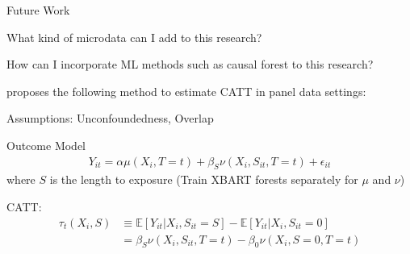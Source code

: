 \documentclass[aspectratio=169,xcolor=dvipsnames]{beamer}
\newenvironment{wideitemize}{\itemize\addtolength{\itemsep}{10pt}}{\enditemize}
\begin{document}
\begin{frame}{Future Work}

\begin{wideitemize}
    \item What kind of microdata can I add to this research?
    \item How can I incorporate ML methods such as causal forest to this research?
    \begin{wideitemize}
        \item \textcite{wang2024longbet} proposes the following method to estimate CATT in panel data settings:
        \item Assumptions: Unconfoundedness, Overlap
        \item Outcome Model 
        \begin{align*}
            Y_{it} = \alpha \mu(X_i, T = t) + \beta_S \nu(X_i, S_{it},T = t) + \epsilon_{it}
        \end{align*}
        where $S$ is the length to exposure (Train XBART forests separately for $\mu$ and $\nu$)
        \item CATT: \begin{align*}
            \tau_t(X_i, S) &\equiv  \mathbb{E}[Y_{it} | X_i, S_{it} = S] - \mathbb{E}[Y_{it} | X_i, S_{it} = 0] \\
            &= \beta_S \nu(X_i, S_{it}, T = t) - \beta_0 \nu(X_i, S=0, T = t)
        \end{align*}
    \end{wideitemize}
\end{wideitemize}

\end{frame}
\end{document}
